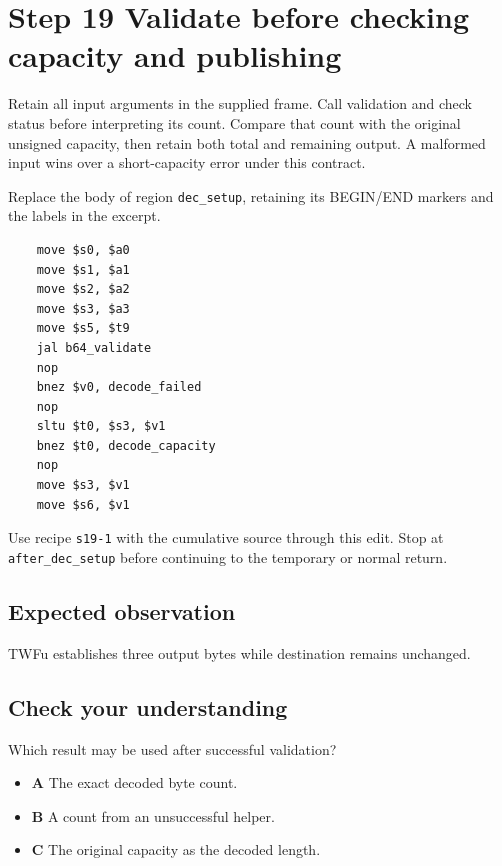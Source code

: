 \section{Step 19 Validate before checking capacity and publishing}\label{base64-s19}

Retain all input arguments in the supplied frame. Call validation and check status before interpreting its count. Compare that count with the original unsigned capacity, then retain both total and remaining output. A malformed input wins over a short-capacity error under this contract.

Replace the body of region \texttt{dec\_setup}, retaining its BEGIN/END markers and the labels in the excerpt.

\begin{verbatim}
    move $s0, $a0
    move $s1, $a1
    move $s2, $a2
    move $s3, $a3
    move $s5, $t9
    jal b64_validate
    nop
    bnez $v0, decode_failed
    nop
    sltu $t0, $s3, $v1
    bnez $t0, decode_capacity
    nop
    move $s3, $v1
    move $s6, $v1
\end{verbatim}

Use recipe \texttt{s19-1} with the cumulative source through this edit. Stop at \texttt{after\_dec\_setup} before continuing to the temporary or normal return.

\subsection{Expected observation}
TWFu establishes three output bytes while destination remains unchanged.

\subsection{Check your understanding}
Which result may be used after successful validation?

\begin{itemize}
  \item \textbf{A} The exact decoded byte count.
  \item \textbf{B} A count from an unsuccessful helper.
  \item \textbf{C} The original capacity as the decoded length.
\end{itemize}
